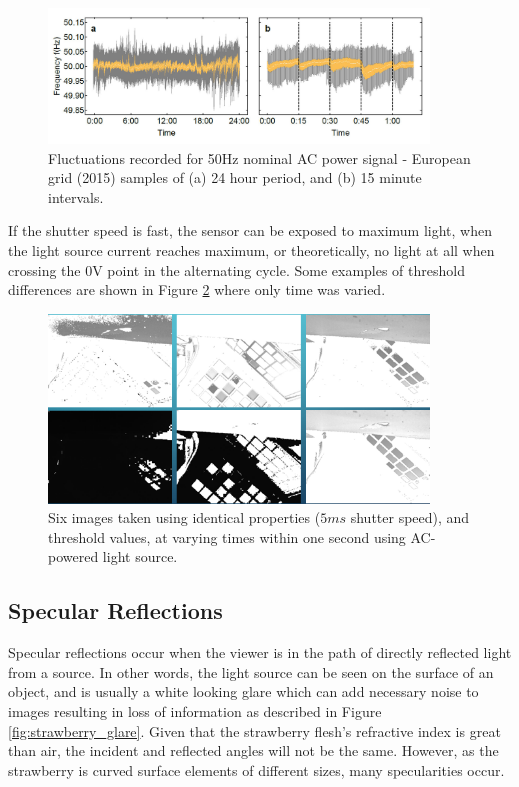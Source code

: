 \documentclass[fleqn,twoside,12pt]{report}
\begin{document}
\begin{figure}[h]
	\centering
	\includegraphics[width=0.9\textwidth]{50hz.jpg}
	\caption{Fluctuations recorded for 50Hz nominal AC power signal - European grid (2015) samples of (a) 24 hour period, and (b) 15 minute intervals.}
	\label{fig:50hz}
\end{figure}


If the shutter speed is fast, the sensor can be exposed to maximum light, when the light source current reaches maximum, or theoretically, no light at all when crossing the 0V point in the alternating cycle. Some examples of threshold differences are shown in Figure \ref{fig:flicker} where only time was varied.

\begin{figure}[h]
	\centering
	\includegraphics[width=0.9\textwidth]{flicker.png}
	\caption{Six images taken using identical properties ($5ms$ shutter speed), and threshold values, at varying times within one second using AC-powered light source.}
	\label{fig:flicker}
\end{figure}

\subsection{Specular Reflections}

Specular reflections occur when the viewer is in the path of directly reflected light from a source. In other words, the light source can be seen on the surface of an object, and is usually a white looking glare which can add necessary noise to images resulting in loss of information as described in Figure \ref{fig:strawberry_glare}. Given that the strawberry flesh's refractive index is great than air, the incident and reflected angles will not be the same. However, as the strawberry is curved surface elements of different sizes, many specularities occur. 
\end{document}
